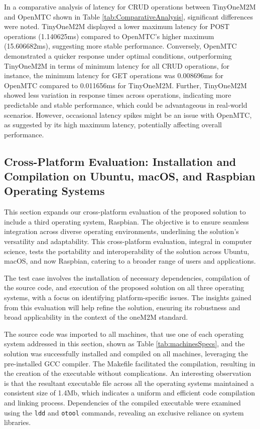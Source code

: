 \documentclass[a4paper,fleqn]{cas-dc}
\begin{document}
In a comparative analysis of latency for CRUD operations between TinyOneM2M and OpenMTC shown in Table \ref{tab:ComparativeAnalysis}, significant differences were noted. TinyOneM2M displayed a lower maximum latency for POST operations (1.140625ms) compared to OpenMTC's higher maximum (15.606682ms), suggesting more stable performance. Conversely, OpenMTC demonstrated a quicker response under optimal conditions, outperforming TinyOneM2M in terms of minimum latency for all CRUD operations, for instance, the minimum latency for GET operations was 0.008696ms for OpenMTC compared to 0.011656ms for TinyOneM2M. Further, TinyOneM2M showed less variation in response times across operations, indicating more predictable and stable performance, which could be advantageous in real-world scenarios. However, occasional latency spikes might be an issue with OpenMTC, as suggested by its high maximum latency, potentially affecting overall performance.

\subsection{Cross-Platform Evaluation: Installation and Compilation on Ubuntu, macOS, and Raspbian Operating Systems}

This section expands our cross-platform evaluation of the proposed solution to include a third operating system, Raspbian. The objective is to ensure seamless integration across diverse operating environments, underlining the solution's versatility and adaptability. This cross-platform evaluation, integral in computer science, tests the portability and interoperability of the solution across Ubuntu, macOS, and now Raspbian, catering to a broader range of users and applications.

The test case involves the installation of necessary dependencies, compilation of the source code, and execution of the proposed solution on all three operating systems, with a focus on identifying platform-specific issues. The insights gained from this evaluation will help refine the solution, ensuring its robustness and broad applicability in the context of the oneM2M standard.

The source code was imported to all machines, that use one of each operating system addressed in this section, shown as Table \ref{tab:machinesSpecs}, and the solution was successfully installed and compiled on all machines, leveraging the pre-installed GCC compiler. The Makefile facilitated the compilation, resulting in the creation of the executable without complications. An interesting observation is that the resultant executable file across all the operating systems maintained a consistent size of 1.4Mb, which indicates a uniform and efficient code compilation and linking process. Dependencies of the compiled executable were examined using the \texttt{ldd} and \texttt{otool} commands, revealing an exclusive reliance on system libraries.
\end{document}

